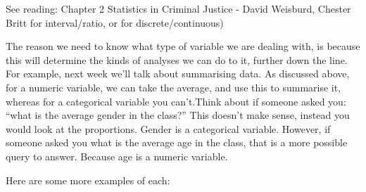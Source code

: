 \documentclass[]{book}
\theoremstyle{definition}
\theoremstyle{definition}
\theoremstyle{definition}
\theoremstyle{remark}
\begin{document}
See reading: Chapter 2 Statistics in Criminal Justice - David Weisburd,
Chester Britt for interval/ratio, or for discrete/continuous)

The reason we need to know what type of variable we are dealing with, is
because this will determine the kinds of analyses we can do to it,
further down the line. For example, next week we'll talk about
summarising data. As discussed above, for a numeric variable, we can
take the average, and use this to summarise it, whereas for a
categorical variable you can't.Think about if someone asked you: ``what
is the average gender in the class?'' This doesn't make sense, instead
you would look at the proportions. Gender is a categorical variable.
However, if someone asked you what is the average age in the class, that
is a more possible query to answer. Because age is a numeric variable.

Here are some more examples of each:
\end{document}
